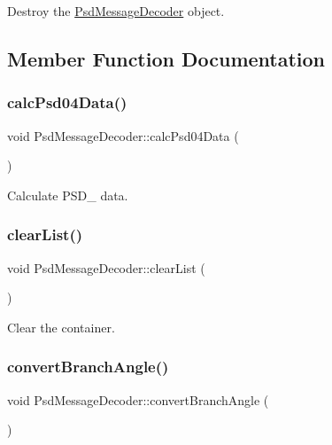 Destroy the \hyperlink{class_psd_message_decoder}{Psd\+Message\+Decoder} object. 



\subsection{Member Function Documentation}
\mbox{\label{class_psd_message_decoder_a34359c377ca6c6940025facd6b177130}} 
\subsubsection{\texorpdfstring{calc\+Psd04\+Data()}{calcPsd04Data()}}
{\footnotesize\ttfamily void Psd\+Message\+Decoder\+::calc\+Psd04\+Data (\begin{DoxyParamCaption}{ }\end{DoxyParamCaption})}



Calculate P\+S\+D\+\_ data. 

\mbox{\label{class_psd_message_decoder_a1d3d09203c12851fd048e97069bc8d5a}} 
\subsubsection{\texorpdfstring{clear\+List()}{clearList()}}
{\footnotesize\ttfamily void Psd\+Message\+Decoder\+::clear\+List (\begin{DoxyParamCaption}{ }\end{DoxyParamCaption})}



Clear the container. 

\mbox{\label{class_psd_message_decoder_adf3d4c8211c7a08f9de2f74509361ea6}} 
\subsubsection{\texorpdfstring{convert\+Branch\+Angle()}{convertBranchAngle()}}
{\footnotesize\ttfamily void Psd\+Message\+Decoder\+::convert\+Branch\+Angle (\begin{DoxyParamCaption}{ }\end{DoxyParamCaption})}



